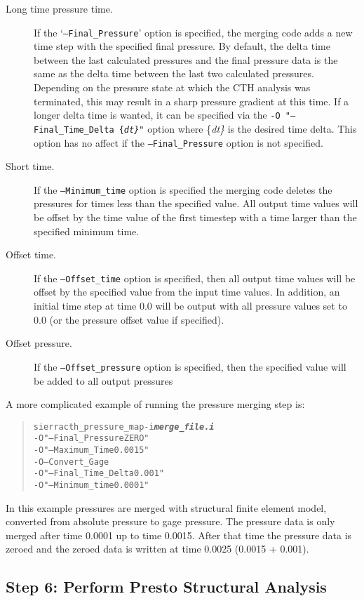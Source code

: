 \documentclass[11pt,twoside]{article}
\newcommand{\cmd}[1]
   {\mbox{\tt #1}\null}
\newcommand{\file}[1]
   {\mbox{\bf\em #1}\null}
\newcommand{\param}[1]
   {\mbox{\{\em #1\}}\null}
\newenvironment{source}
{\small\begin{quote}\begin{alltt}}
{\end{alltt}\end{quote}\normalsize}
\begin{document}
\begin{description}
\item [Long time pressure time.]  If the `\cmd{{--}Final\_Pressure}' option
is specified, the merging code adds a new time step with the specified
final pressure. By default, the delta time between the last calculated
pressures and the final pressure data is the same as the delta time
between the last two calculated pressures. Depending on the pressure
state at which the CTH analysis was terminated, this may result in a
sharp pressure gradient at this time.  If a longer delta time is
wanted, it can be specified via the \cmd{{}-O
"{--}Final\_Time\_Delta \param{dt}"} option where
\param{dt} is the desired time delta. This
option has no affect if the \cmd{{--}Final\_Pressure} option is
not specified.
\item [Short time.]  If the \cmd{{}--Minimum\_time} option is specified the
merging code deletes the pressures for times less than the specified
value. All output time values will be offset by the time value of the
first timestep with a time larger than the specified minimum time.
\item [Offset time.] If the \cmd{{}--Offset\_time} option is specified,
then all output time values will be offset by the specified value from
the input time values.  In addition, an initial time step at time 0.0
will be output with all pressure values set to 0.0 (or the pressure
offset value if specified).

\item [Offset pressure.] If the \cmd{{}--Offset\_pressure} option is
specified, then the specified value will be added to all output pressures
\end{description}

A more complicated example of running the pressure merging step is:

\begin{source}
sierra cth_pressure_map -i \file{merge\_file.i}
   {-}O "{--}Final\_Pressure ZERO"
   {-}O "{--}Maximum\_Time 0.0015"
   {-}O {--}Convert\_Gage
   {-}O "{--}Final\_Time\_Delta 0.001"
   {-}O "{--}Minimum\_time 0.0001"
\end{source}

In this example pressures are merged with structural finite element
model, converted from absolute pressure to gage pressure.  The
pressure data is only merged after time 0.0001 up to time 0.0015.
 After that time the pressure data is zeroed and the zeroed data is
written at time 0.0025 (0.0015 + 0.001).

\subsection{Step 6: Perform Presto Structural Analysis}\label{sec:step6}
\end{document}
